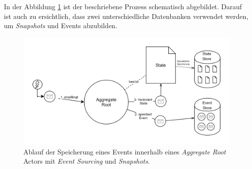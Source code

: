 In der Abbildung \ref{fig:implementation:eventSourcingAggregateRoot} ist der beschriebene Prozess schematisch abgebildet. Darauf ist auch zu ersichtlich, dass zwei unterschiedliche Datenbanken verwendet werden, um \textit{Snapshots} und Events abzubilden.
\begin{figure}
  \centering
  \includegraphics[width=\linewidth]{gfx/implementation/EventSourcingAkka}
  \caption{Ablauf der Speicherung eines Events innerhalb eines \textit{Aggregate Root} Actors mit \textit{Event Sourcing} und \textit{Snapshots}.}
  \label{fig:implementation:eventSourcingAggregateRoot}
\end{figure} 

